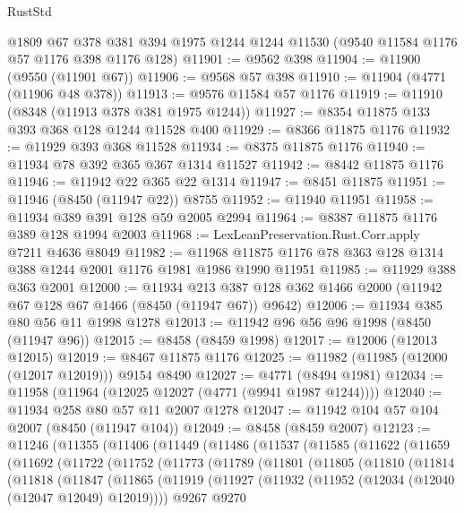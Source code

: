 \begin{lexlean}{RustStd}
\begin{coremodule}
    @1809
    @67
    @378
    @381
    @394
    @1975
    @1244
    @1244
    @11530
    (@9540 @11584 @1176 @57 @1176 @398 @1176 @128)
@11901 := @9562 @398
@11904 := @11900 (@9550 (@11901 @67))
@11906 := @9568 @57 @398
@11910 := @11904 (@4771 (@11906 @48 @378))
@11913 := @9576 @11584 @57 @1176
@11919 := @11910 (@8348 (@11913 @378 @381 @1975 @1244))
@11927 := @8354 @11875 @133 @393 @368 @128 @1244 @11528 @400
@11929 := @8366 @11875 @1176
@11932 := @11929 @393 @368 @11528
@11934 := @8375 @11875 @1176
@11940 := @11934 @78 @392 @365 @367 @1314 @11527
@11942 := @8442 @11875 @1176
@11946 := @11942 @22 @365 @22 @1314
@11947 := @8451 @11875
@11951 := @11946 (@8450 (@11947 @22)) @8755
@11952 := @11940 @11951
@11958 := @11934 @389 @391 @128 @59 @2005 @2994
@11964 := @8387 @11875 @1176 @389 @128 @1994 @2003
@11968 := LexLeanPreservation.Rust.Corr.apply @7211 @4636 @8049
@11982 := @11968 @11875 @1176 @78 @363 @128 @1314 @388 @1244 @2001 @1176 @1981 @1986 @1990 @11951
@11985 := @11929 @388 @363 @2001
@12000 := @11934
    @213
    @387
    @128
    @362
    @1466
    @2000
    (@11942 @67 @128 @67 @1466 (@8450 (@11947 @67)) @9642)
@12006 := @11934 @385 @80 @56 @11 @1998 @1278
@12013 := @11942 @96 @56 @96 @1998 (@8450 (@11947 @96))
@12015 := @8458 (@8459 @1998)
@12017 := @12006 (@12013 @12015)
@12019 := @8467 @11875 @1176
@12025 := @11982 (@11985 (@12000 (@12017 @12019))) @9154 @8490
@12027 := @4771 (@8494 @1981)
@12034 := @11958 (@11964 (@12025 @12027 (@4771 (@9941 @1987 @1244))))
@12040 := @11934 @258 @80 @57 @11 @2007 @1278
@12047 := @11942 @104 @57 @104 @2007 (@8450 (@11947 @104))
@12049 := @8458 (@8459 @2007)
@12123 := @11246
    (@11355
      (@11406
        (@11449
          (@11486
            (@11537
              (@11585
                (@11622
                  (@11659
                    (@11692
                      (@11722
                        (@11752
                          (@11773
                            (@11789
                              (@11801
                                (@11805
                                  (@11810
                                    (@11814
                                      (@11818
                                        (@11847
                                          (@11865
                                            (@11919
                                              (@11927
                                                (@11932
                                                  (@11952 (@12034 (@12040 (@12047 @12049) @12019))))
                                                @9267
                                                @9270

\end{coremodule}
\end{lexlean}
